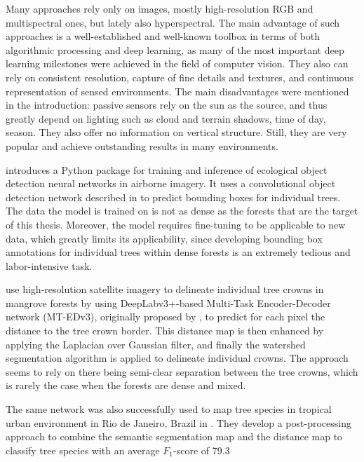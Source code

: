 Many approaches rely only on images, mostly high-resolution RGB and multispectral ones, but lately also hyperspectral.
The main advantage of such approaches is a well-established and well-known toolbox in terms of both algorithmic processing and deep learning, as many of the most important deep learning milestones were achieved in the field of computer vision.
They also can rely on consistent resolution, capture of fine details and textures, and continuous representation of sensed environments.
The main disadvantages were mentioned in the introduction: passive sensors rely on the sun as the source, and thus greatly depend on lighting such as cloud and terrain shadows, time of day, season.
They also offer no information on vertical structure.
Still, they are very popular and achieve outstanding results in many environments.

\citet{weinsteinDeepForestPythonPackage2020} introduces a Python package for training and inference of ecological object detection neural networks in airborne imagery.
It uses a convolutional object detection network described in \citet{weinsteinIndividualTreeCrownDetection2019} to predict bounding boxes for individual trees.
The data the model is trained on is not as dense as the forests that are the target of this thesis.
Moreover, the model requires fine-tuning to be applicable to new data, which greatly limits its applicability, since developing bounding box annotations for individual trees within dense forests is an extremely tedious and labor-intensive task.

\citet{lassalleDeepLearningbasedIndividual2022} use high-resolution satellite imagery to delineate individual tree crowns in mangrove forests by using DeepLabv3+-based Multi-Task Encoder-Decoder network (MT-EDv3), originally proposed by \citet{larosaMultitaskFullyConvolutional2021}, to predict for each pixel the distance to the tree crown border.
This distance map is then enhanced by applying the Laplacian over Gaussian filter, and finally the watershed segmentation algorithm is applied to delineate individual crowns.
The approach seems to rely on there being semi-clear separation between the tree crowns, which is rarely the case when the forests are dense and mixed.

The same network was also successfully used to map tree species in tropical urban environment in Rio de Janeiro, Brazil in \citet{martinsDeepLearningbasedTree2021}.
They develop a post-processing approach to combine the semantic segmentation map and the distance map to classify tree species with an average $F_1$-score of 79.3%

